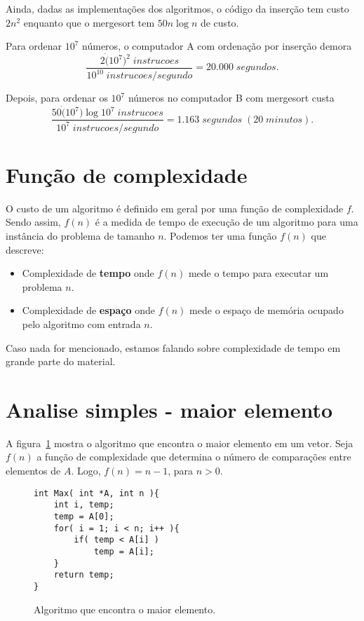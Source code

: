 Ainda, dadas as implementações dos algoritmos, o código da inserção tem custo
$2n^2$ enquanto que o mergesort tem $50n \log n$ de custo.

Para ordenar $10^7$ números, o computador A com ordenação por inserção demora
\begin{equation*}
\frac{2 \dot (10^7)^2\; instrucoes}{10^{10}\; instrucoes/segundo} = 20.000 \; segundos.
\end{equation*}

Depois, para ordenar os $10^7$ números no computador B com mergesort custa
\begin{equation*}
\frac{50 \dot (10^7) \log 10^7\; instrucoes}{10^{7}\; instrucoes/segundo} = 1.163 \; segundos \;(20\; minutos).
\end{equation*}

\section{Função de complexidade}

O custo de um algoritmo é definido em geral por uma função de complexidade $f$. Sendo assim,
$f(n)$ é a medida de tempo de execução de um algoritmo para uma instância do problema de tamanho $n$.
Podemos ter uma função $f(n)$ que descreve:
\begin{itemize}
\item Complexidade de {\bf tempo} onde $f(n)$ mede o tempo para executar um problema $n$.
\item Complexidade de {\bf espaço} onde $f(n)$ mede o espaço de memória ocupado pelo algoritmo
com entrada $n$.
\end{itemize}

Caso nada for mencionado, estamos falando sobre complexidade de tempo em grande parte do material.

\section{Analise simples - maior elemento}

A figura~\ref{aula02:algo:max} mostra o algoritmo que encontra o maior elemento em um vetor.
Seja $f(n)$ a função de complexidade que determina o número de comparações entre elementos de $A$.
Logo, $f(n) = n - 1$, para $n > 0$.
%
\begin{figure}[!htb]
\centering
\begin{framed}
\begin{lstlisting}
int Max( int *A, int n ){
	int i, temp;
	temp = A[0];
	for( i = 1; i < n; i++ ){
		if( temp < A[i] )
			temp = A[i];
	}
	return temp;
}
\end{lstlisting}
\end{framed}
\caption{Algoritmo que encontra o maior elemento.}
\label{aula02:algo:max}
\end{figure}

